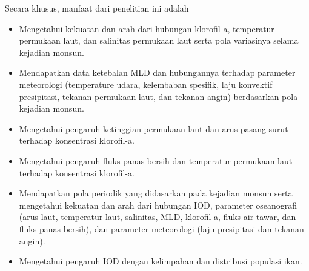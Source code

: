 \begin{spacing}{1.5}
	Secara khusus, manfaat dari penelitian ini adalah
	\begin{itemize}
		\item Mengetahui kekuatan dan arah dari hubungan klorofil-a, temperatur permukaan laut, dan salinitas permukaan laut serta pola variasinya selama kejadian monsun.
		
		\item Mendapatkan data ketebalan MLD dan hubungannya terhadap parameter meteorologi (temperature udara, kelembaban spesifik, laju konvektif presipitasi, tekanan permukaan laut, dan tekanan angin) berdasarkan pola kejadian monsun.
		
		\item Mengetahui pengaruh ketinggian permukaan laut dan arus pasang surut terhadap konsentrasi klorofil-a.
		
		\item Mengetahui pengaruh fluks panas bersih dan temperatur permukaan laut terhadap konsentrasi klorofil-a.
		
		\item Mendapatkan pola periodik yang didasarkan pada kejadian monsun serta mengetahui kekuatan dan arah dari hubungan IOD, parameter oseanografi (arus laut, temperatur laut, salinitas, MLD, klorofil-a, fluks air tawar, dan fluks panas bersih), dan parameter meteorologi (laju presipitasi dan tekanan angin).
		
		\item Mengetahui pengaruh IOD dengan kelimpahan dan distribusi populasi ikan.
		
	\end{itemize}
	

\end{spacing}
